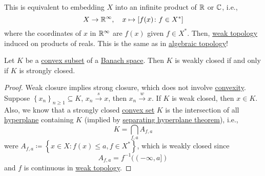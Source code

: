 \begin{remark}
	This is equivalent to embedding \(X\) into an infinite product of \(\mathbb{\MakeUppercase{r}} \) or \(\mathbb{\MakeUppercase{c}} \), i.e.,
	\[
		X\to \mathbb{\MakeUppercase{r}} ^{\infty} ,\quad x\mapsto \left[ f(x)\colon f\in X^{\ast} \right]
	\]
	where the coordinates of \(x\) in \(\mathbb{\MakeUppercase{r}} ^{\infty} \) are \(f(x)\) given \(f\in X^{\ast} \). Then, \hyperref[def:weak-topology]{weak topology} induced on products of reals. This is the same as in \href{https://www.pbb.wtf/posts/Notes#algebraic-topology-math592-umich}{algebraic topology}!
\end{remark}

\begin{proposition}\label{prop:weak-closedness}
	Let \(K\) be a \hyperref[def:convex-set]{convex subset} of a \hyperref[def:Banach-space]{Banach space}. Then \(K\) is weakly closed if and only if \(K\) is strongly closed.
\end{proposition}
\begin{proof}
	Weak closure implies strong closure, which does not involve \hyperref[def:convex-set]{convexity}. Suppose \(\left\{ x_n \right\} _{n\geq 1}\subseteq K\), \(x_n \overset{s}{\to } x\), then \(x_n \overset{w}{\to } x\). If \(K\) is weak closed, then \(x\in K\). Also, we know that a strongly closed \hyperref[def:convex-set]{convex set} \(K\) is the intersection of all \hyperref[def:hyperplane]{hyperplane} containing \(K\) (implied by \hyperref[thm:separation-of-convex-sets]{separating hyperplane theorem}), i.e.,
	\[
		K = \bigcap_{f, a} A_{f, a}
	\]
	were \(A_{f, a}\coloneqq \left\{ x\in X \colon f(x) \leq a, f\in X^{\ast} \right\} \), which is weakly closed since
	\[
		A_{f, a}= f^{-1} ((-\infty , a])
	\]
	and \(f\) is continuous in \hyperref[def:weak-topology]{weak topology}.
\end{proof}